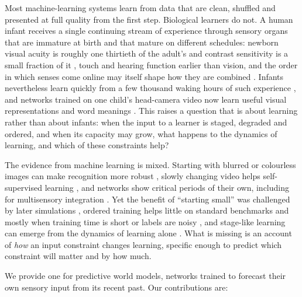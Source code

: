 \documentclass{article}
\begin{document}
Most machine-learning systems learn from data that are clean, shuffled and presented at full quality from the first step. Biological learners do not. A human infant receives a single continuing stream of experience through sensory organs that are immature at birth and that mature on different schedules: newborn visual acuity is roughly one thirtieth of the adult's and contrast sensitivity is a small fraction of it \autocite{banks1988optical,norcia1985spatial}, touch and hearing function earlier than vision, and the order in which senses come online may itself shape how they are combined \autocite{turkewitz1982limitations}. Infants nevertheless learn quickly from a few thousand waking hours of such experience \autocite{smith2018curriculum}, and networks trained on one child's head-camera video now learn useful visual representations and word meanings \autocite{orhan2020self,orhan2024learning,vong2024grounded}. This raises a question that is about learning rather than about infants: when the input to a learner is staged, degraded and ordered, and when its capacity may grow, what happens to the dynamics of learning, and which of these constraints help?

The evidence from machine learning is mixed. Starting with blurred or colourless images can make recognition more robust \autocite{vogelsang2018potential,vogelsang2024impact}, slowly changing video helps self-supervised learning \autocite{sheybani2023curriculum}, and networks show critical periods of their own, including for multisensory integration \autocite{achille2019critical,kleinman2023critical}. Yet the benefit of ``starting small'' \autocite{elman1993learning} was challenged by later simulations \autocite{rohde1999language}, ordered training helps little on standard benchmarks and mostly when training time is short or labels are noisy \autocite{wu2021curricula}, and stage-like learning can emerge from the dynamics of learning alone \autocite{saxe2019mathematical}. What is missing is an account of \emph{how} an input constraint changes learning, specific enough to predict which constraint will matter and by how much.

We provide one for predictive world models, networks trained to forecast their own sensory input from its recent past. Our contributions are:
\end{document}

